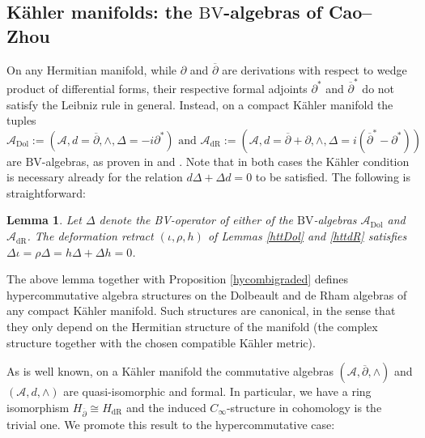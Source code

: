 \documentclass[a4paper]{amsart}
\newtheorem{lemm}[theo]{Lemma}
\theoremstyle{definition}
\theoremstyle{theorem}
\newcommand{\Aa}{\mathcal{A}}
\newcommand{\del}{\partial}
\newcommand{\delb}{{\overline\partial}}
\newcommand{\BV}{{\mathrm{BV}}}
\newcommand{\Dol}{\mathrm{Dol}}
\newcommand{\dR}{\mathrm{dR}}
\begin{document}
\subsection{Kähler manifolds: the $\BV$-algebras of Cao--Zhou}
On any Hermitian manifold, while $\del$ and $\delb$ are derivations with respect to wedge product of differential forms,
their respective formal adjoints  $\del^*$ and $\delb^*$
do not satisfy the Leibniz rule in general.
Instead, on a compact Kähler manifold the tuples 
\[\Aa_{\mathrm{Dol}}:=(\Aa,d=\delb,\wedge,\Delta=-i\del^*)\text{ and }\Aa_{\mathrm{dR}}:=(\Aa,d=\delb+\del,\wedge,\Delta=i(\delb^*-\del^*))\] are $\BV$-algebras, as proven in \cite{CaZh} and \cite{CaZh2}. Note that in both cases the Kähler condition is necessary already for the relation $d\Delta+\Delta d=0$ to be satisfied.
The following is straightforward:

\begin{lemm}Let $\Delta$ denote the BV-operator of either of the $\BV$-algebras $\Aa_{\Dol}$ and $\Aa_{\dR}$.
The deformation retract $(\iota,\rho,h)$ of Lemmas \ref{httDol} and \ref{httdR} satisfies
$\Delta \iota=\rho \Delta=h\Delta+\Delta h=0$.
\end{lemm}


The above lemma together with Proposition \ref{hycombigraded} defines hypercommutative algebra structures on the Dolbeault and de Rham algebras of any compact Kähler manifold. Such structures are canonical, in the sense that they only depend on the Hermitian structure of the manifold (the complex structure together with the chosen compatible Kähler metric).


As is well known, on a  Kähler manifold the commutative algebras $(\Aa,\delb,\wedge)$ and $(\Aa,d,\wedge)$ are quasi-isomorphic and 
formal. In particular, we have a ring isomorphism $H_\delb\cong H_{\dR}$ and the induced $C_\infty$-structure in cohomology is the trivial one.
We promote this result to the hypercommutative case:
\end{document}
